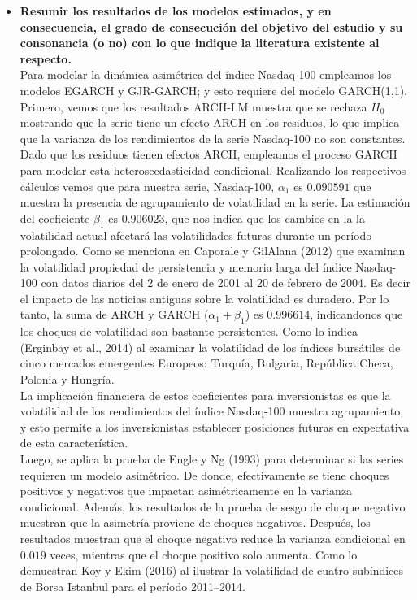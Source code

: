 \begin{itemize}
    \item \textbf{Resumir los resultados de los modelos estimados, y en consecuencia, el grado de consecución del objetivo del estudio y su consonancia (o no) con lo que indique la literatura existente al respecto.}\\

	  Para modelar la dinámica asimétrica del índice Nasdaq-100 empleamos los modelos EGARCH y GJR-GARCH; y esto requiere del modelo GARCH(1,1).
	  Primero, vemos que los resultados  ARCH-LM muestra que se rechaza $H_0$ mostrando que la serie tiene un efecto ARCH en los residuos, lo que implica que la varianza de los rendimientos de la serie Nasdaq-100 no son constantes. Dado que los residuos tienen efectos ARCH, empleamos el proceso GARCH para modelar esta heteroscedasticidad condicional. Realizando los respectivos cálculos vemos que para nuestra serie, Nasdaq-100, $\alpha_1$ es $0.090591$ que muestra la presencia de agrupamiento de volatilidad en la serie. La estimación del coeficiente $\beta_1$ es $0.906023$, que nos indica que los cambios en la la volatilidad actual afectará las volatilidades futuras durante un período prolongado. Como se menciona en Caporale y GilAlana (2012) que examinan la volatilidad propiedad de persistencia y memoria larga del índice Nasdaq-100 con datos diarios del 2 de enero de 2001 al 20 de febrero de 2004. Es decir el impacto de las noticias antiguas sobre la volatilidad es duradero. Por lo tanto, la suma de ARCH y  GARCH ($\alpha_1+\beta_1$) es $0.996614$, indicandonos que los choques de volatilidad son bastante persistentes. Como lo indica (Erginbay et al., 2014) al examinar la volatilidad de los índices bursátiles de cinco mercados emergentes Europeos: Turquía, Bulgaria, República Checa, Polonia y Hungría.\\
	  La implicación financiera de estos coeficientes para inversionistas es que la volatilidad de los rendimientos del índice Nasdaq-100 muestra agrupamiento, y esto permite a los inversionistas establecer posiciones futuras en expectativa de esta característica. \\
	    
	  Luego, se aplica la prueba de Engle y Ng (1993) para determinar si las series requieren un modelo asimétrico. De donde, efectivamente se tiene choques positivos y negativos que impactan asimétricamente en la varianza condicional. Además, los resultados de la prueba de sesgo de choque negativo muestran que la asimetría proviene de choques negativos. Después, los resultados muestran que el choque negativo reduce la varianza condicional en $0.019$ veces, mientras que el choque positivo solo aumenta. Como lo demuestran Koy y Ekim (2016) al ilustrar la volatilidad de cuatro subíndices de Borsa Istanbul para el período 2011–2014.\\


\end{itemize}

